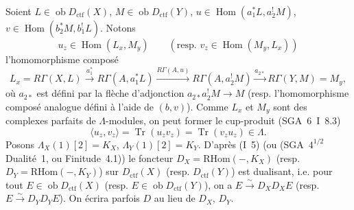 \documentclass[11pt]{article}
\DeclareMathOperator{\Hom}{Hom}
\newcommand{\ob}{\operatorname{ob}}
\providecommand{\RHom}{\mathrm{RHom}}
\providecommand{\ctf}{\mathrm{ctf}}
\providecommand{\Tr}{\operatorname{Tr}}
\providecommand{\Tr}{\operatorname{Tr}}
\providecommand{\Tr}{\operatorname{Tr}}
\providecommand{\RHom}{\mathrm{RHom}}
\providecommand{\Hom}{\operatorname{Hom}}
\providecommand{\ob}{\operatorname{ob}}
\providecommand{\RHom}{\mathrm R\mathcal{H}om}
\providecommand{\Tr}{\operatorname{Tr}}
\providecommand{\RHom}{\mathrm{RHom}}
\providecommand{\Hom}{\operatorname{Hom}}
\providecommand{\Tr}{\operatorname{Tr}}
\begin{document}
Soient $L\in \ob D_{\ctf}(X)$, $M\in \ob D_{\ctf}(Y)$, $u\in\Hom(a_1^*L,a_2^!M)$, $v\in\Hom(b_2^*M,b_1^!L)$. Notons
\[
u_z\in\Hom(L_x,M_y)\qquad (\text{resp. }v_z\in\Hom(M_y,L_x))
\]
l'homomorphisme composé
\[
L_x=R\Gamma(X,L)\xrightarrow{a_1^*}R\Gamma(A,a_1^*L)
\xrightarrow{R\Gamma(A,u)}R\Gamma(A,a_2^!M)
\xrightarrow{a_{2*}}R\Gamma(Y,M)=M_y,
\]
où $a_{2*}$ est défini par la flèche d'adjonction $a_{2*}a_2^!M\to M$ (resp. l'homomorphisme composé analogue défini à l'aide de $(b,v)$). Comme $L_x$ et $M_y$ sont des complexes parfaits de $\Lambda$-modules, on peut former le cup-produit (SGA~6~I~8.3)
\begin{equation}\tag{1.1.1}
\langle u_z,v_z\rangle=\Tr(u_zv_z)=\Tr(v_zu_z)\in\Lambda.
\end{equation}
Posons $\Lambda_X(1)[2]=K_X$, $\Lambda_Y(1)[2]=K_Y$. D'après (I~5) (ou (SGA~$4^{1/2}$ Dualité~1, ou Finitude~4.1)) le foncteur $D_X=\RHom(-,K_X)$ (resp. $D_Y=\RHom(-,K_Y)$) sur $D_{\ctf}(X)$ (resp. $D_{\ctf}(Y)$) est dualisant, i.e. pour tout $E\in\ob D_{\ctf}(X)$ (resp. $E\in\ob D_{\ctf}(Y)$), on a $E\xrightarrow{\sim}D_XD_XE$ (resp. $E\xrightarrow{\sim}D_YD_YE$). On écrira parfois $D$ au lieu de $D_X$, $D_Y$.
\end{document}
